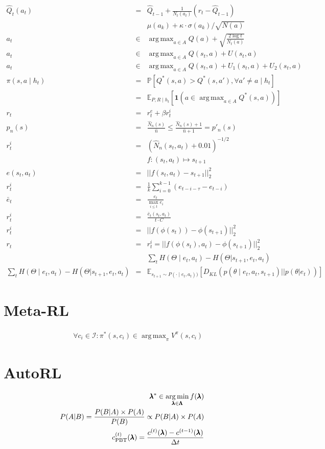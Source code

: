 \documentclass[]{article}
\DeclareMathOperator*{\argmax}{arg\,max}
\DeclareMathOperator*{\argmin}{arg\,min}
\begin{document}
\begin{eqnarray}
    \hat{Q}_t(a_t) &=& \hat{Q}_{t-1} + \frac{1}{N_t(a_t)} (r_t - \hat{Q}_{t-1})\\
    &&\mu(a_k) + \kappa \cdot \sigma(a_k) / \sqrt{N(a)}\\
    a_t &\in& \argmax_{a \in A} Q(a) + \sqrt{\frac{2\log t }{N_t(a)}}\\
    a_t &\in& \argmax_{a \in A} Q(s_t, a) + U(s_t, a) \\
    a_t &\in& \argmax_{a \in A} Q(s_t, a) + U_1(s_t, a) + U_2(s_t, a)\\
    \pi(s, a \mid h_t) &=& \mathbb{P} [Q^*(s,a) > Q^*(s,a'), \forall a' \neq a \mid h_t] \\
    &=& \mathbb{E}_{P, R \mid h_t} \left[\mathbf{1}(a \in \argmax_{a \in A} Q^*(s,a))\right]\\
    r_t &=& r^e_t + \beta r_t^i\\
    p_n(s) &=&  \frac{\hat{N}_n(s)}{\hat{n}} \leq \frac{\hat{N}_n(s) + 1}{\hat{n} + 1} = p'_n(s)\\
    r_t^i &=& (\hat{N}_n (s_t, a_t) + 0.01)^{-1/2} \\
    && f: (s_t, a_t) \mapsto s_{t+1} \\
    e(s_t, a_t) &=& || f(s_t, a_t) - s_{t+1}||_2^2\\
    r_t^i &=& \frac{1}{k} \sum_{i=0}^{k-1} (e_{t-i-\tau} - e_{t-i})\\
    \bar{e}_t &=& \frac{e_t}{\max_{i \leq t} e_i} \\
    r_t^i &=& \frac{\bar{e}_t(s_t, a_t)}{t \cdot C}\\
    r_t^i &=& || f(\phi(s_{t})) - \phi(s_{t+1})||^2_2\\
    r_t  &=& r_t^i = ||f(\phi(s_t), a_t) - \phi(s_{t+1}) ||_2^2\\
    &&\sum_t H(\Theta \mid e_t, a_t) - H(\Theta | s_{t+1}, e_t, a_t)\\
    \sum_t H(\Theta \mid e_t, a_t) - H(\Theta | s_{t+1}, e_t, a_t) &=& \mathbb{E}_{s_{t+1}\sim P(\cdot\mid e_t, a_t))} \left[ D_{KL} (p(\theta \mid e_t, a_t, s_{t+1}) || p(\theta|e_t))  \right]
\end{eqnarray}

\section{Meta-RL}

\begin{eqnarray}
   && \forall c_i \in \mathcal{I}: \pi^*(s, c_i)  \in \argmax_\pi V^\pi(s, c_i)
\end{eqnarray}

\section{AutoRL}

\begin{eqnarray}
   \conf^* \in \argmin_{\conf \in \confs} f(\conf)\\
   P(A \vert B) = \frac{P(B \vert A) \times  P(A)}{P(B)} \propto P(B \vert A) \times  P(A)\\
   \cost_{\text{PBT}}^{(t)}(\conf)= \frac{\cost^{(t)}(\conf) - \cost^{(t-1)}(\conf)}{\Delta t}\\
\end{eqnarray}
\end{document}
